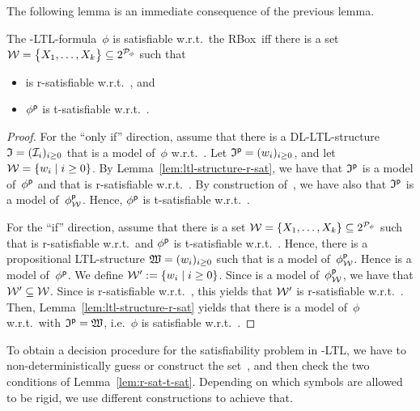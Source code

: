 \noindent
The following lemma is an immediate consequence of the previous lemma.

\begin{lemma}\label{lem:r-sat-t-sat}
    The \SHOQ-LTL-formula~$\phi$ is satisfiable w.r.t.\ the RBox~\Rmc iff there
    is a set $\mathcal{W}=\bigl\{X_1,\dots,X_k\bigr\}\subseteq 2^{\mathcal{P}_\phi}$ such that
    \begin{itemize}
        \item \Wmc is r-satisfiable w.r.t.~\Rmc, and
        \item $\phi^\mathsf{p}$ is t-satisfiable w.r.t.~\Wmc.
    \end{itemize}
\end{lemma}

\begin{proof}
    For the \enquote{only if} direction, assume that there is a DL-LTL-structure
    $\mathfrak{I}=(\mathcal{I}_i)_{i\ge 0}$ that is a model of~$\phi$ w.r.t.~\Rmc.
    Let $\mathfrak{I}^\mathsf{p}=(w_i)_{i\ge 0}$, and let $\mathcal{W}=\{w_i\mid i\ge 0\}$.
    By Lemma~\ref{lem:ltl-structure-r-sat}, we have that $\mathfrak{I}^\mathsf{p}$ is a model
    of~$\phi^\mathsf{p}$ and that \Wmc is r-satisfiable w.r.t.~\Rmc.
    By construction of~\Wmc, we have also that $\mathfrak{I}^\mathsf{p}$ is a model
    of~$\phi^\mathsf{p}_\mathcal{W}$.  Hence, $\phi^\mathsf{p}$ is t-satisfiable w.r.t.~\Wmc.

    For the \enquote{if} direction, assume that there is a set
    $\mathcal{W}=\{X_1,\dots,X_k\}\subseteq 2^{\mathcal{P}_\phi}$ such that \Wmc is
    r-satisfiable w.r.t.~\Rmc and $\phi^\mathsf{p}$ is t-satisfiable w.r.t.~\Wmc.
    Hence, there is a propositional LTL-structure $\mathfrak{W}=(w_i)_{i\ge 0}$ such
    that \Wmf is a model of~$\phi^\mathsf{p}_\mathcal{W}$.
    Hence \Wmf is a model of~$\phi^\mathsf{p}$.  We define
    $\mathcal{W}':=\{w_i\mid i\ge 0\}$.  Since \Wmf is a model of~$\phi^\mathsf{p}_\mathcal{W}$, we
    have that $\mathcal{W}'\subseteq\mathcal{W}$.  Since \Wmc is r-satisfiable w.r.t.~\Rmc,
    this yields that $\mathcal{W}'$ is r-satisfiable w.r.t.~\Rmc.  Then,
    Lemma~\ref{lem:ltl-structure-r-sat} yields that there is a model \Imf
    of~$\phi$ w.r.t.~\Rmc with $\mathfrak{I}^\mathsf{p}=\mathfrak{W}$, i.e.~$\phi$ is satisfiable
    w.r.t.~\Rmc.
\end{proof}

\noindent
To obtain a decision procedure for the satisfiability problem in \SHOQ-LTL, we
have to non-deterministically guess or construct the set~\Wmc, and then check
the two conditions of Lemma~\ref{lem:r-sat-t-sat}.
%
Depending on which symbols are allowed to be rigid, we use different
constructions to achieve that.

